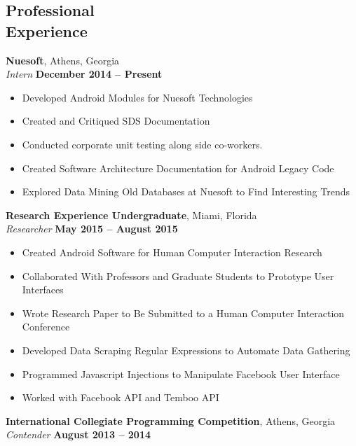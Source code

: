 \documentclass[margin,line]{resume}
\begin{document}
\begin{resume}
   \section{\mysidestyle Professional\\Experience}
    \textbf{Nuesoft}, Athens, Georgia \vspace{1mm}\\\vspace{1mm}%
    \textsl{Intern} \hfill \textbf{December 2014 -- Present}
    \begin{itemize}
    	\item Developed Android Modules for Nuesoft Technologies
    	\item Created and Critiqued SDS Documentation
    	\item Conducted corporate unit testing along side co-workers.
    	\item Created Software Architecture Documentation for Android Legacy Code
    	\item Explored Data Mining Old Databases at Nuesoft to Find Interesting Trends
    \end{itemize}
       \textbf{Research Experience Undergraduate}, Miami, Florida \vspace{1mm}\\\vspace{1mm}%
       \textsl{Researcher} \hfill \textbf{May 2015 -- August 2015}
       \begin{itemize}
       	\item Created Android Software for Human Computer Interaction Research
       	\item Collaborated With Professors and Graduate Students to Prototype User Interfaces
       	\item Wrote Research Paper to Be Submitted to a Human Computer Interaction Conference
       	\item Developed Data Scraping Regular Expressions to Automate Data Gathering
       	\item Programmed Javascript Injections to Manipulate Facebook User Interface
       	\item Worked with Facebook API and Temboo API 
       \end{itemize}
   \textbf{International Collegiate Programming Competition}, Athens, Georgia \vspace{1mm}\\\vspace{1mm}%
   \textsl{Contender} \hfill \textbf{August 2013 -- 2014}
   \begin{itemize}

\end{itemize}
\end{resume}
\end{document}
